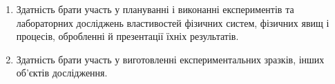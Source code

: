 \documentclass{Syllabus}
\begin{document}
\begin{enumerate}
    \item [ФК 2:] Здатність брати участь у плануванні і виконанні експериментів та лабораторних досліджень властивостей фізичних систем, фізичних явищ і процесів, обробленні й презентації їхніх результатів.
    \item [ФК 3:] Здатність брати участь у виготовленні експериментальних зразків, інших об'єктів дослідження.
\end{enumerate}
\end{document}
